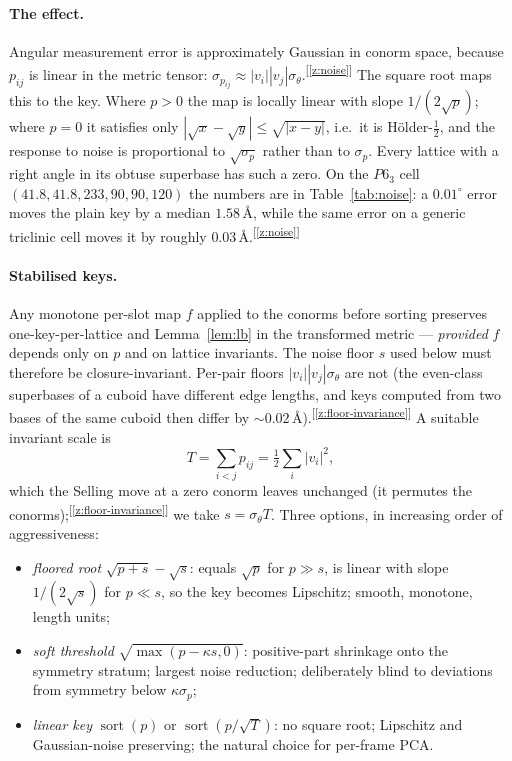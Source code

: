 \documentclass[11pt]{article}
\newcommand{\Ang}{\text{\AA}}
\newcommand{\chk}[1]{\textsuperscript{[\ref{#1}]}}
\begin{document}
\paragraph{The effect.}
Angular measurement error is approximately Gaussian in conorm space, because $p_{ij}$ is linear in the metric tensor: $\sigma_{p_{ij}}\approx|v_i||v_j|\sigma_\theta$.\chk{z:noise} The square root maps this to the key. Where $p>0$ the map is locally linear with slope $1/(2\sqrt p)$; where $p=0$ it satisfies only $|\sqrt x-\sqrt y|\le\sqrt{|x-y|}$, i.e.\ it is H\"older-$\tfrac12$, and the response to noise is proportional to $\sqrt{\sigma_p}$ rather than to $\sigma_p$. Every lattice with a right angle in its obtuse superbase has such a zero. On the $P6_3$ cell $(41.8,41.8,233,90,90,120)$ the numbers are in Table~\ref{tab:noise}: a $0.01^\circ$ error moves the plain key by a median $1.58\,\Ang$, while the same error on a generic triclinic cell moves it by roughly $0.03\,\Ang$.\chk{z:noise}

\paragraph{Stabilised keys.}
Any monotone per-slot map $f$ applied to the conorms before sorting preserves one-key-per-lattice and Lemma~\ref{lem:lb} in the transformed metric --- \emph{provided} $f$ depends only on $p$ and on lattice invariants. The noise floor $s$ used below must therefore be closure-invariant. Per-pair floors $|v_i||v_j|\sigma_\theta$ are not (the even-class superbases of a cuboid have different edge lengths, and keys computed from two bases of the same cuboid then differ by $\sim0.02\,\Ang$).\chk{z:floor-invariance} A suitable invariant scale is
\[
T=\sum_{i<j}p_{ij}=\tfrac12\sum_i|v_i|^2 ,
\]
which the Selling move at a zero conorm leaves unchanged (it permutes the conorms);\chk{z:floor-invariance} we take $s=\sigma_\theta T$. Three options, in increasing order of aggressiveness:
\begin{itemize}
\item \emph{floored root} $\sqrt{p+s}-\sqrt s$: equals $\sqrt p$ for $p\gg s$, is linear with slope $1/(2\sqrt s)$ for $p\ll s$, so the key becomes Lipschitz; smooth, monotone, length units;
\item \emph{soft threshold} $\sqrt{\max(p-\kappa s,0)}$: positive-part shrinkage onto the symmetry stratum; largest noise reduction; deliberately blind to deviations from symmetry below $\kappa\sigma_p$;
\item \emph{linear key} $\operatorname{sort}(p)$ or $\operatorname{sort}(p/\sqrt T)$: no square root; Lipschitz and Gaussian-noise preserving; the natural choice for per-frame PCA.
\end{itemize}
\end{document}
